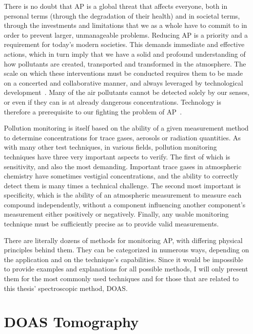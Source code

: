 There is no doubt that \gls{AP} is a global threat that affects
everyone, both in personal terms (through the degradation of their
health) and in societal terms, through the investments and limitations
that we as a whole have to commit to in order to prevent larger,
unmanageable problems. Reducing \gls{AP} is a priority and a requirement
for today's modern societies. This demands immediate and effective
actions, which in turn imply that we have a solid and profound
understanding of how pollutants are created, transported and transformed
in the atmosphere. The scale on which these interventions must be
conducted requires them to be made on a concerted and collaborative
manner, and always leveraged by technological
development~\cite{EEA2019}. Many of the air pollutants cannot be
detected solely by our senses, or even if they can is at already
dangerous concentrations. Technology is therefore a prerequisite to our
fighting the problem of \acrlong{AP}~\cite{Vallero2014}.

Pollution monitoring is itself based on the ability of a given
measurement method to determine concentrations for trace gases, aerosols
or radiation quantities. As with many other test techniques, in various
fields, pollution monitoring techniques have three very important
aspects to verify. The first of which is sensitivity, and also the most
demanding. Important trace gases in atmospheric chemistry have sometimes
vestigial concentrations, and the ability to correctly detect them is
many times a technical challenge. The second most important is
specificity, which is the ability of an atmospheric measurement to
measure each compound independently, without a component influencing
another component's measurement either positively or negatively.
Finally, any usable monitoring technique must be sufficiently precise as
to provide valid measurements.

There are literally dozens of methods for monitoring \gls{AP}, with
differing physical principles behind them. They can be categorized in
numerous ways, depending on the application and on the technique's
capabilities. Since it would be impossible to provide examples and
explanations for all possible methods, I will only present them for the
most commonly used techniques and for those that are related to this
thesis' spectroscopic method, \gls{DOAS}.





\section{DOAS Tomography}%
\label{sec:doas_tomography}










